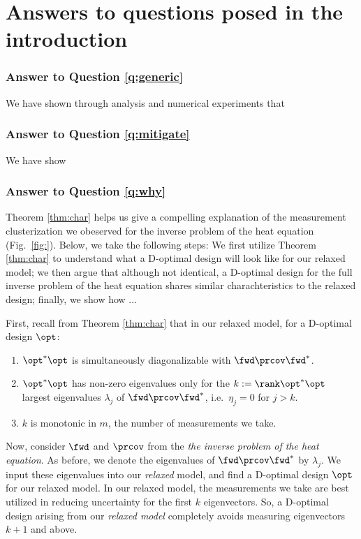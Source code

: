 \section{Answers to questions posed in the introduction}


\subsubsection{Answer to Question \ref{q:generic}}
We have shown through analysis and numerical experiments that



\subsubsection{Answer to Question \ref{q:mitigate}}
We have show


\subsubsection{Answer to Question \ref{q:why}}
Theorem \ref{thm:char} helps us give a compelling explanation of the
measurement clusterization we obeserved for the inverse problem of the
heat equation (Fig.~\ref{fig:}). Below, we take the following steps:
We first utilize Theorem \ref{thm:char} to understand what a D-optimal
design will look like for our relaxed model; we then argue that
although not identical, a D-optimal design for the full inverse
problem of the heat equation shares similar charachteristics to the
relaxed design; finally, we show how ...

First, recall from Theorem \ref{thm:char} that in our relaxed model,
for a D-optimal design $\opt$:
\begin{enumerate}
  \item $\opt^*\opt$ is simultaneously diagonalizable with $\fwd
    \prcov \fwd^*$.
  \item $\opt^*\opt$ has non-zero eigenvalues only for the $k:=\rank
    \opt^*\opt$ largest eigenvalues $\lambda_j$ of $\fwd\prcov\fwd^*$,
    i.e.~$\eta_j=0$ for $j>k$.
  \item $k$ is monotonic in $m$, the number of measurements we take.
\end{enumerate}

Now, consider $\fwd$ and $\prcov$ from the \emph{the inverse problem
of the heat equation}. As before, we denote the eigenvalues of
$\fwd\prcov\fwd^*$ by $\lambda_j$. We input these eigenvalues into our
\emph{relaxed} model, and find a D-optimal design $\opt$ for our
relaxed model. In our relaxed model, the measurements we take are best
utilized in reducing uncertainty for the first $k$ eigenvectors. So, a
D-optimal design arising from our \emph{relaxed model} completely
avoids measuring eigenvectors $k+1$ and above.

